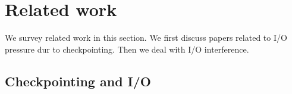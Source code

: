 \documentclass{article}
\begin{document}
% 
%

\section{Related work}
\label{sec.related}

We survey related work in this section. We first discuss papers related to I/O pressure 
dur to checkpointing. Then we deal with I/O interference.

\subsection{Checkpointing and I/O}
\end{document}
